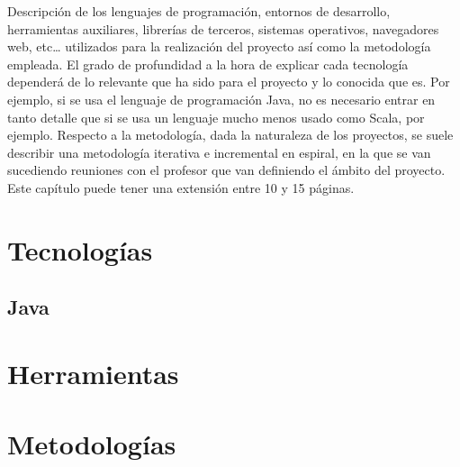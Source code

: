 Descripción de los lenguajes de programación, entornos de desarrollo, herramientas auxiliares, librerías de terceros, sistemas operativos, navegadores web, etc… utilizados para la realización del proyecto así como la metodología empleada. 
El grado de profundidad a la hora de explicar cada tecnología dependerá de lo relevante que ha sido para el proyecto y lo conocida que es. 
Por ejemplo, si se usa el lenguaje de programación Java, no es necesario entrar en tanto detalle que si se usa un lenguaje mucho menos usado como Scala, por ejemplo. Respecto a la metodología, dada la naturaleza de los proyectos, se suele describir una metodología iterativa e incremental en espiral, en la que se van sucediendo reuniones con el profesor que van definiendo el ámbito del proyecto. Este capítulo puede tener una extensión entre 10 y 15 páginas.

\section{Tecnologías}

\subsection{Java}

\section{Herramientas}

\section{Metodologías}
